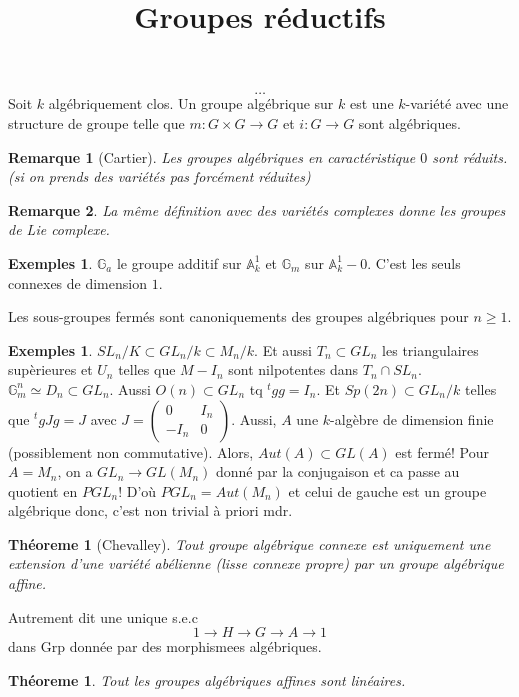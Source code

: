 \documentclass[a4paper,12pt]{book}
\title{Groupes réductifs}
\date{}
\newcommand{\A}{\mathbb{A}}
\newcommand{\Gr}{\mathbb{G}}
\theoremstyle{plain}
\newtheorem{thm}[subsection]{Théoreme}
\newtheorem{rem}{Remarque}
\theoremstyle{definition}
\newtheorem{exs}[subsection]{Exemples}
\theoremstyle{remark}
\begin{document}
\maketitle
\tableofcontents
\[\ldots\]
Soit $k$ algébriquement clos. Un groupe algébrique sur $k$ est
une $k$-variété avec une structure de groupe telle que $m\colon
G\times G\to G$ et $i\colon G\to G$ sont algébriques. 
\begin{rem}[Cartier]
  Les groupes algébriques en caractéristique $0$ sont réduits.
  (si on prends des variétés pas forcément réduites)
\end{rem}
\begin{rem}
  La même définition avec des variétés complexes donne les
  groupes de Lie complexe.
\end{rem}
\begin{exs}
  $\Gr_a$ le groupe additif sur $\A^1_k$ et $\Gr_m$ sur $\A^1_k-0$.
  C'est les seuls connexes de dimension $1$.
\end{exs}
Les sous-groupes fermés sont canoniquements des groupes algébriques
pour $n\geq 1$.
\begin{exs}
  $SL_n/K\subset GL_n/k\subset M_n/k$. Et aussi $T_n\subset GL_n$
  les triangulaires supèrieures et $U_n$ telles que $M-I_n$ sont
  nilpotentes dans $T_n\cap SL_n$. $\Gr_m^n\simeq D_n\subset GL_n$.
  Aussi $O(n)\subset GL_n$ tq $^tgg=I_n$. Et $Sp(2n)\subset GL_n/k$
  telles que $^tgJg=J$ avec 
  $J=\begin{pmatrix}0& I_n\\-I_n&0\end{pmatrix}$. Aussi, $A$
  une $k$-algèbre de dimension finie 
  (possiblement non commutative). Alors, $Aut(A)\subset GL(A)$
  est fermé! Pour $A=M_n$, on a $GL_n\to GL(M_n)$ donné par
  la conjugaison et ca passe au quotient en $PGL_n$! D'où
  $PGL_n=Aut(M_n)$ et celui de gauche est un groupe algébrique
  donc, c'est non trivial à priori mdr.
\end{exs}
\begin{thm}[Chevalley]
  Tout groupe algébrique connexe est uniquement une extension
  d'une variété abélienne (lisse connexe propre) par un groupe
  algébrique affine.
\end{thm}
Autrement dit une unique s.e.c
\[1\to H\to G\to A\to 1\]
dans Grp donnée par des morphismees algébriques.

\begin{thm}
  Tout les groupes algébriques affines sont linéaires.
\end{thm}
\end{document}

